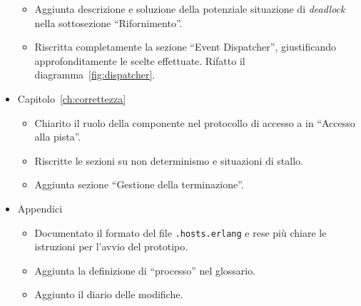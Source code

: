 \begin{itemize}
\begin{itemize}
	\item Aggiunta descrizione e soluzione della potenziale situazione di \textit{deadlock} nella sottosezione ``Rifornimento''.
	\item Riscritta completamente la sezione ``Event Dispatcher'', giustificando approfonditamente le scelte effettuate. Rifatto il diagramma~\ref{fig:dispatcher}.
	\end{itemize}
\item Capitolo~\ref{ch:correttezza}
	\begin{itemize}
	\item Chiarito il ruolo della componente \sched{} nel protocollo di accesso a \track{} in ``Accesso alla pista''.
	\item Riscritte le sezioni su non determinismo e situazioni di stallo.
	\item Aggiunta sezione ``Gestione della terminazione''.
	\end{itemize}
\item Appendici
	\begin{itemize}
	\item Documentato il formato del file \texttt{.hosts.erlang} e rese più chiare le istruzioni per l'avvio del prototipo.
	\item Aggiunta la definizione di ``processo'' nel glossario.
	\item Aggiunto il diario delle modifiche.
	\end{itemize}
\end{itemize}

